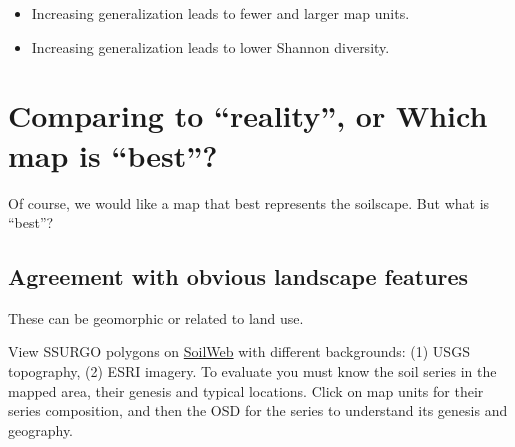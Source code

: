 \documentclass[
  letterpaper,
  DIV=11,
  numbers=noendperiod]{scrartcl}
\begin{document}
\begin{itemize}
\item
  Increasing generalization leads to fewer and larger map units.
\item
  Increasing generalization leads to lower Shannon diversity.
\end{itemize}

\hypertarget{comparing-to-reality-or-which-map-is-best}{%
\section{Comparing to ``reality'', or Which map is
``best''?}\label{comparing-to-reality-or-which-map-is-best}}

Of course, we would like a map that best represents the soilscape. But
what is ``best''?

\hypertarget{agreement-with-obvious-landscape-features}{%
\subsection{Agreement with obvious landscape
features}\label{agreement-with-obvious-landscape-features}}

These can be geomorphic or related to land use.

View SSURGO polygons on
\href{https://casoilresource.lawr.ucdavis.edu/gmap/}{SoilWeb} with
different backgrounds: (1) USGS topography, (2) ESRI imagery. To
evaluate you must know the soil series in the mapped area, their genesis
and typical locations. Click on map units for their series composition,
and then the OSD for the series to understand its genesis and geography.
\end{document}
